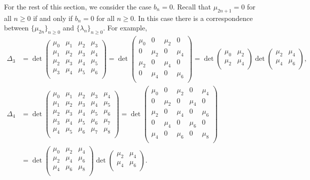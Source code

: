 \documentclass[oneside]{book}
\numberwithin{equation}{section}
\theoremstyle{definition}
\begin{document}
For the rest of this section, we consider the case \( b_n=0 \). Recall
that \( \mu_{2n+1} = 0 \) for all \( n\ge0 \) if and only if
\( b_n=0 \) for all \( n\ge0 \). In this case there is a
correspondence between \( \{ \mu_{2n}\}_{n\ge 0} \) and
\( \{ \lambda_n\}_{n\ge 0} \). For example,
\begin{align*}
  \Delta_3
  & = \det 
  \begin{pmatrix}
\mu_0 & \mu_1 & \mu_2 & \mu_3 \\
\mu_1 & \mu_2 & \mu_3 & \mu_4 \\
\mu_2 & \mu_3 & \mu_4 & \mu_5 \\
\mu_3 & \mu_4 & \mu_5 & \mu_6 \\
\end{pmatrix} =\det 
  \begin{pmatrix}
\mu_0 & 0 & \mu_2 & 0 \\
0 & \mu_2 & 0 & \mu_4 \\
\mu_2 & 0 & \mu_4 & 0 \\
0 & \mu_4 & 0 & \mu_6 \\
\end{pmatrix}
= \det
\begin{pmatrix}
\mu_0 & \mu_2 \\
\mu_2 & \mu_4 \\
\end{pmatrix}
\det
\begin{pmatrix}
\mu_2 & \mu_4 \\
\mu_4 & \mu_6 \\
\end{pmatrix},\\
  \Delta_4
  &= \det 
  \begin{pmatrix}
\mu_0 & \mu_1 & \mu_2 & \mu_3 & \mu_4 \\
\mu_1 & \mu_2 & \mu_3 & \mu_4 & \mu_5 \\
\mu_2 & \mu_3 & \mu_4 & \mu_5 & \mu_6 \\
\mu_3 & \mu_4 & \mu_5 & \mu_6 & \mu_7 \\
\mu_4 & \mu_5 & \mu_6 & \mu_7 & \mu_8 \\
\end{pmatrix} =\det 
  \begin{pmatrix}
\mu_0 & 0 & \mu_2 & 0 & \mu_4 \\
0 & \mu_2 & 0 & \mu_4 & 0\\
\mu_2 & 0 & \mu_4 & 0 & \mu_6 \\
0 & \mu_4 & 0 & \mu_6 & 0 \\
\mu_4 & 0 & \mu_6 & 0 & \mu_8 \\
\end{pmatrix}\\
&= \det
\begin{pmatrix}
\mu_0 & \mu_2 & \mu_4 \\
\mu_2 & \mu_4 & \mu_6 \\
\mu_4 & \mu_6 & \mu_8 \\
\end{pmatrix}
\det
\begin{pmatrix}
\mu_2 & \mu_4 \\
\mu_4 & \mu_6 \\
\end{pmatrix}.
\end{align*}
\end{document}
